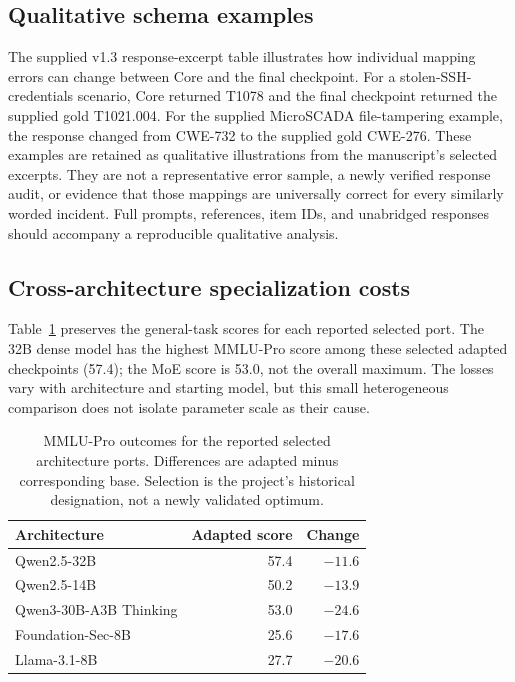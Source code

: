 \documentclass[journal]{IEEEtran}
\begin{document}
\subsection{Qualitative schema examples}
The supplied v1.3 response-excerpt table illustrates how individual mapping errors can change between Core and the final checkpoint. For a stolen-SSH-credentials scenario, Core returned T1078 and the final checkpoint returned the supplied gold T1021.004. For the supplied MicroSCADA file-tampering example, the response changed from CWE-732 to the supplied gold CWE-276. These examples are retained as qualitative illustrations from the manuscript's selected excerpts. They are not a representative error sample, a newly verified response audit, or evidence that those mappings are universally correct for every similarly worded incident. Full prompts, references, item IDs, and unabridged responses should accompany a reproducible qualitative analysis.

\subsection{Cross-architecture specialization costs}
Table~\ref{tab:ports} preserves the general-task scores for each reported selected port. The 32B dense model has the highest MMLU-Pro score among these selected adapted checkpoints (57.4); the MoE score is 53.0, not the overall maximum. The losses vary with architecture and starting model, but this small heterogeneous comparison does not isolate parameter scale as their cause.

\begin{table}[!t]
\centering\small
\caption{MMLU-Pro outcomes for the reported selected architecture ports. Differences are adapted minus corresponding base. Selection is the project's historical designation, not a newly validated optimum.}\label{tab:ports}
\begin{tabular}{@{}lrr@{}}
\toprule Architecture & Adapted score & Change \\\midrule
Qwen2.5-32B & 57.4 & $-11.6$ \\
Qwen2.5-14B & 50.2 & $-13.9$ \\
Qwen3-30B-A3B Thinking & 53.0 & $-24.6$ \\
Foundation-Sec-8B & 25.6 & $-17.6$ \\
Llama-3.1-8B & 27.7 & $-20.6$ \\\bottomrule
\end{tabular}
\end{table}
\end{document}
